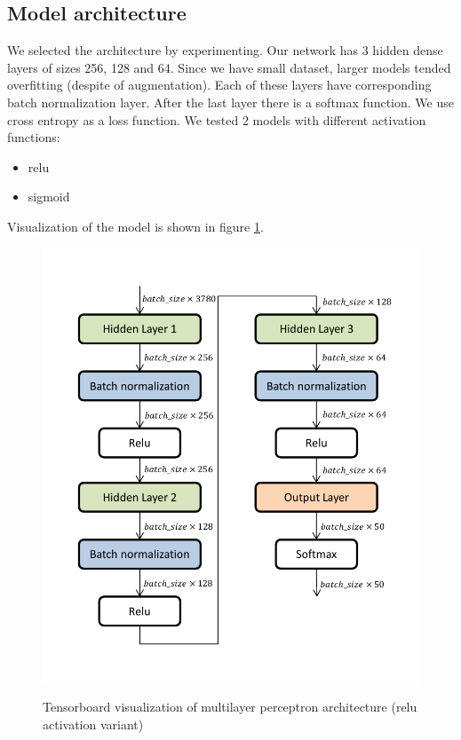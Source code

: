 ﻿\documentclass[a4paper]{article}
\begin{document}
\subsection{Model architecture}
We selected the architecture by experimenting.
Our network has 3 hidden dense layers of sizes 256, 128 and 64.
Since we have small dataset, larger models tended overfitting
(despite of augmentation).
Each of these layers have corresponding batch normalization layer.
After the last layer there is a softmax function.
We use cross entropy as a loss function.
We tested 2 models with different activation functions:
\begin{itemize}
    \item relu
    \item sigmoid
\end{itemize}
Visualization of the model is shown in figure \ref{fig:arch}.

\begin{figure}[h]
    \caption[]{Tensorboard visualization of multilayer perceptron architecture (relu activation variant)}
    \centering
    \includegraphics[page=2,width=1.0\textwidth]{architecture.pdf}
    \label{fig:arch}
\end{figure}
\end{document}
